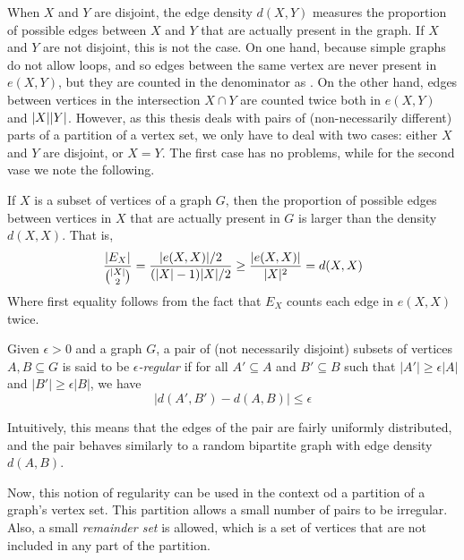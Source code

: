         When $X$ and $Y$ are disjoint, the edge density $d(X, Y)$ measures the proportion of possible edges between $X$
        and $Y$ that are actually present in the graph.
        If $X$ and $Y$ are not disjoint, this is not the case.
        On one hand, because simple graphs do not allow loops, and so edges between the same vertex are never present in
        $e(X,Y)$, but they are counted in the denominator as .
        On the other hand, edges between vertices in the intersection $X \cap Y$ are counted twice both in $e(X,Y)$
        and $| X || Y |$.
        However, as this thesis deals with pairs of (non-necessarily different) parts of a partition of a vertex set,
        we only have to deal with two cases: either $X$ and $Y$ are disjoint, or $X = Y$.
        The first case has no problems, while for the second vase we note the following.

        \begin{remark}
            If $X$ is a subset of vertices of a graph $G$, then the proportion of possible edges between vertices in $X$
            that are actually present in $G$ is larger than the density $d(X, X)$.
            That is,
            \[
                \frac{| E_X |}{{|X| \choose 2}}
                    = \frac{| e(X, X) | / 2}{( |X|-1 )|X| / 2}
                    \geq \frac{| e(X, X) |}{|X|^2}
                    = d(X, X)
            \]
            Where first equality follows from the fact that $E_X$ counts each edge in $e(X, X)$ twice.
        \end{remark}

        \begin{definition}
            Given $\epsilon > 0$ and a graph $G$, a pair of (not necessarily disjoint) subsets of vertices $A, B \subseteq G$
            is said to be \emph{$\epsilon$-regular} if for all $A' \subseteq A$ and $B' \subseteq B$ such that
            $|A'| \geq \epsilon |A|$ and $|B'| \geq \epsilon |B|$, we have
            \[
                |d(A', B') - d(A, B)| \leq \epsilon
            \]
        \end{definition}

        Intuitively, this means that the edges of the pair are fairly uniformly distributed, and the pair behaves
        similarly to a random bipartite graph with edge density $d(A, B)$.

        Now, this notion of regularity can be used in the context od a partition of a graph's vertex set.
        This partition allows a small number of pairs to be irregular.
        Also, a small \emph{remainder set} is allowed, which is a set of vertices that are not included in any part
        of the partition.


